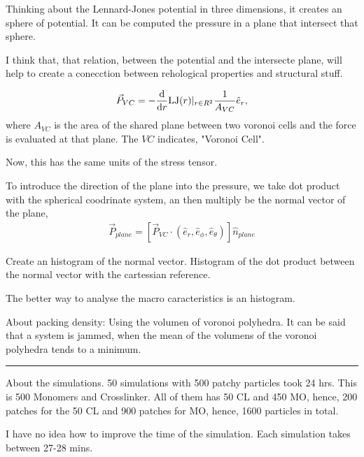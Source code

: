 \documentclass[a4paper, 11pt, oneside]{researchjournal} %
\begin{document}
Thinking about the Lennard-Jones potential in three dimensions, it creates an sphere of potential.
It can be computed the pressure in a plane that intersect that sphere.

I think that, that relation, between the potential and the intersecte plane, will help to create a conecction between rehological properties and structural stuff.

\begin{align*}
	\vec{P}_{VC} = -\dv{r}\mathrm{LJ}(r)|_{r\in R^{2}}\frac{1}{A_{VC}}\hat{e}_{r},
\end{align*}
where $A_{VC}$ is the area of the shared plane between two voronoi cells and the force is evaluated at that plane.
The $VC$ indicates, "Voronoi Cell".

Now, this has the same units of the stress tensor.

To introduce the direction of the plane into the pressure, we take dot product with the spherical coodrinate system, an then multiply be the normal vector of the plane,
\begin{align*}
	\vec{P}_{plane} = \left[\vec{P}_{VC}\cdot\left(\hat{e}_r,\hat{e}_\phi,\hat{e}_\theta\right)\right]\hat{n}_{plane}
\end{align*}


Create an histogram of the normal vector.
Histogram of the dot product between the normal vector with the cartessian reference.

The better way to analyse the macro caracteristics is an histogram.


About packing density: Using the volumen of voronoi polyhedra.
It can be said that a system is jammed, when the mean of the volumens of the voronoi polyhedra tends to a minimum.

\rule{\textwidth}{0.4pt}

About the simulations.
50 simulations with 500 patchy particles took 24 hrs.
This is 500 Monomers and Crosslinker. 
All of them has 50 CL and 450 MO, hence, 200 patches for the 50 CL and 900 patches for MO, hence, 1600 particles in total.

I have no idea how to improve the time of the simulation.
Each simulation takes between 27-28 mins. 
\end{document}
